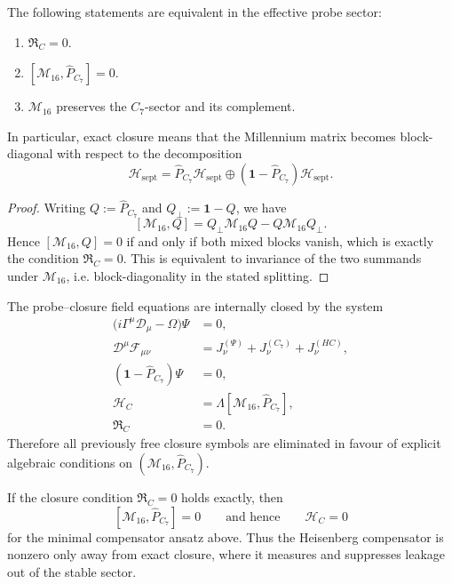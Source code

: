 \begin{proposition}
\label{prop:equivalent-closure-criteria}
The following statements are equivalent in the effective probe sector:
\begin{enumerate}
  \item $\mathfrak R_C=0$.
  \item $[\mathcal M_{16},\hat P_{C_7}]=0$.
  \item $\mathcal M_{16}$ preserves the $C_7$-sector and its complement.
\end{enumerate}
In particular, exact closure means that the Millennium matrix becomes
block-diagonal with respect to the decomposition
\[
  \mathcal H_{\mathrm{sept}}
  = \hat P_{C_7}\mathcal H_{\mathrm{sept}}
  \oplus
  (\mathbf 1-\hat P_{C_7})\mathcal H_{\mathrm{sept}}.
\]
\end{proposition}

\begin{proof}
Writing $Q:=\hat P_{C_7}$ and $Q_\perp:=\mathbf 1-Q$, we have
\[
  [\mathcal M_{16},Q]
  =
  Q_\perp\mathcal M_{16}Q - Q\mathcal M_{16}Q_\perp.
\]
Hence $[\mathcal M_{16},Q]=0$ if and only if both mixed blocks vanish,
which is exactly the condition $\mathfrak R_C=0$.
This is equivalent to invariance of the two summands under
$\mathcal M_{16}$, i.e. block-diagonality in the stated splitting.
\end{proof}

\begin{theorem}
\label{thm:closed-master-system}
The probe--closure field equations are internally closed by the system
\begin{align*}
  \bigl(i\Gamma^\mu\mathcal D_\mu - \Omega\bigr)\Psi &= 0,\\
  \mathcal D^\mu\mathcal F_{\mu\nu}
    &= J^{(\Psi)}_\nu + J^{(C_7)}_\nu + J^{(HC)}_\nu,\\
  (\mathbf 1-\hat P_{C_7})\Psi &= 0,\\
  \mathcal H_C &= \Lambda[\mathcal M_{16},\hat P_{C_7}],\\
  \mathfrak R_C &= 0.
\end{align*}
Therefore all previously free closure symbols are eliminated in favour
of explicit algebraic conditions on $(\mathcal M_{16},\hat P_{C_7})$.
\end{theorem}

\begin{corollary}
If the closure condition $\mathfrak R_C=0$ holds exactly, then
\[
  [\mathcal M_{16},\hat P_{C_7}] = 0
  \qquad\text{and hence}\qquad
  \mathcal H_C = 0
\]
for the minimal compensator ansatz above.
Thus the Heisenberg compensator is nonzero only away from exact closure,
where it measures and suppresses leakage out of the stable sector.
\end{corollary}

